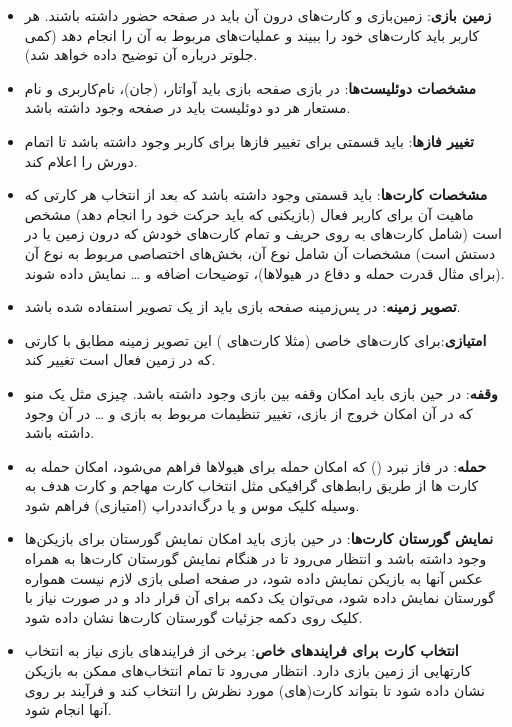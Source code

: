 \documentclass[]{article}
\begin{document}
\begin{itemize}
    \item \textbf{زمین بازی}:
     زمین‌بازی و کارت‌های درون آن باید در صفحه حضور داشته باشند. هر کاربر باید کارت‌های خود را ببیند و عملیات‌های مربوط به آن را انجام دهد (کمی جلوتر درباره آن توضیح داده خواهد شد).
    \item \textbf{مشخصات دوئلیست‌ها}:
     در بازی صفحه بازی باید آواتار،  (جان)، نام‌کاربری و نام مستعار هر دو دوئلیست باید در صفحه وجود داشته باشد.
    \item \textbf{تغییر فازها}:
     باید قسمتی برای تغییر فازها برای کاربر وجود داشته باشد تا اتمام دورش را اعلام کند.
     
    \item \textbf{مشخصات کارت‌ها}:
     باید قسمتی وجود داشته باشد که بعد از انتخاب هر کارتی که ماهیت آن برای کاربر فعال (بازیکنی که باید حرکت خود را انجام دهد) مشخص است (شامل کارت‌های به روی حریف و تمام کارت‌های خودش که درون زمین یا در دستش است) مشخصات آن شامل نوع آن، بخش‌های اختصاصی مربوط به نوع آن (برای مثال قدرت حمله و دفاع در هیولاها)، توضیحات اضافه و … نمایش داده شوند.
    \item \textbf{تصویر زمینه}:
     در پس‌زمینه صفحه بازی باید از یک تصویر استفاده شده باشد.
    \item \textbf{امتیازی}:برای کارت‌های خاصی (مثلا کارت‌های ) این تصویر زمینه مطابق با کارتی که در زمین فعال است تغییر کند.
    
    \item \textbf{وقفه}: در حین بازی باید امکان وقفه بین بازی وجود داشته باشد. چیزی مثل یک منو  که در آن امکان خروج از بازی، تغییر تنظیمات مربوط به بازی و … در آن وجود داشته باشد.
    \item \textbf{حمله}: در فاز نبرد () که امکان حمله برای هیولاها فراهم می‌شود، امکان حمله به کارت ها از طریق رابط‌های گرافیکی مثل انتخاب کارت مهاجم و کارت هدف به وسیله کلیک موس و یا درگ‌اند‌دراپ (امتیازی) فراهم شود.
    
    \item \textbf{نمایش گورستان کارت‌ها}: در حین بازی باید امکان نمایش گورستان برای بازیکن‌ها وجود داشته باشد و انتظار می‌رود تا در هنگام نمایش گورستان کارت‌ها به همراه عکس آنها به بازیکن نمایش داده شود، در صفحه اصلی بازی لازم نیست همواره گورستان نمایش داده شود، می‌توان یک دکمه برای آن قرار داد و در صورت نیاز با کلیک روی دکمه جزئیات گورستان کارت‌ها نشان داده شود.
    
    
    \item \textbf{انتخاب کارت برای فرایندهای خاص}: برخی از فرایندهای بازی نیاز به انتخاب کارتهایی از زمین بازی دارد. انتظار می‌رود تا تمام انتخاب‌های ممکن به بازیکن نشان داده شود تا بتواند کارت(های) مورد نظرش را انتخاب کند و فرآیند بر روی آنها انجام شود.
    

\end{itemize}
\end{document}
